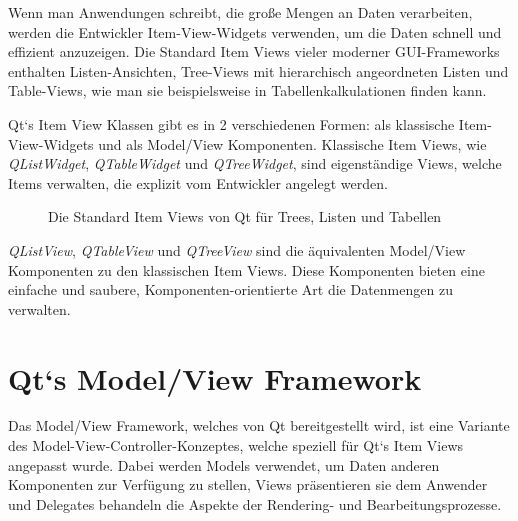 \documentclass[11pt,a4paper,titlepage]{scrreprt}
\begin{document}
Wenn man Anwendungen schreibt, die große Mengen an Daten verarbeiten, werden die
Entwickler Item-View-Widgets verwenden, um die Daten schnell und effizient anzuzeigen.
Die Standard Item Views vieler moderner GUI-Frameworks enthalten Listen-Ansichten,
Tree-Views mit hierarchisch angeordneten Listen und Table-Views, wie man sie 
beispielsweise in Tabellenkalkulationen finden kann.

Qt`s Item View Klassen gibt es in 2 verschiedenen Formen: als klassische Item-View-Widgets
und als Model/View Komponenten. Klassische Item Views, wie {\itshape QListWidget}, 
{\itshape QTableWidget} und {\itshape QTreeWidget}, sind eigenständige Views, welche Items
verwalten, die explizit vom Entwickler angelegt werden.

\enlargethispage{1cm}
\begin{figure}[h]
\caption{Die Standard Item Views von Qt für Trees, Listen und Tabellen}
\end{figure}

{\itshape QListView}, {\itshape QTableView} und {\itshape QTreeView} sind die äquivalenten
Model/View Komponenten zu den klassischen Item Views. Diese Komponenten bieten eine
einfache und saubere, Komponenten-orientierte Art die Datenmengen zu verwalten.

\section{Qt`s Model/View Framework}
Das Model/View Framework, welches von Qt bereitgestellt wird, ist eine Variante des
Model-View-Controller-Konzeptes, welche speziell für Qt`s Item Views angepasst wurde.
Dabei werden Models verwendet, um Daten anderen Komponenten zur Verfügung zu stellen,
Views präsentieren sie dem Anwender und Delegates behandeln die Aspekte der
Rendering- und Bearbeitungsprozesse.
\end{document}
